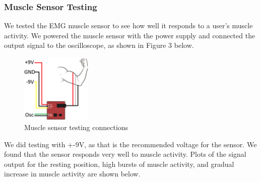 \documentclass[12pt,scrartcl,titlepage]{article}
\begin{document}
  \subsubsection{Muscle Sensor Testing}

  We tested the EMG muscle sensor to see how well it responds to a user’s muscle activity. We powered the muscle sensor with the power supply and connected the output signal to the oscilloscope, as shown in Figure 3 below.
  
  \begin{figure}[h!]
    \centering
    \includegraphics[width=0.3\textwidth]{msv3-setup.png}
    \caption{Muscle sensor testing connections}
  \end{figure}

  We did testing with +-9V, as that is the recommended voltage for the sensor. We found that the sensor responds very well to muscle activity. Plots of the signal output for the resting position, high bursts of muscle activity, and gradual increase in muscle activity are shown below.
\end{document}
